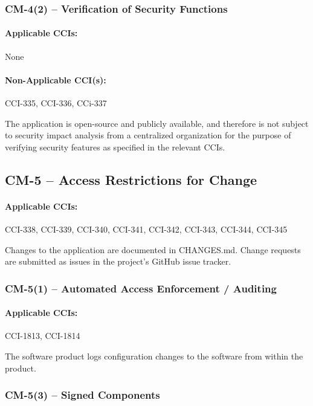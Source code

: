 \documentclass[letterpaper, 10pt, twoside]{article}
\begin{document}
\subsubsection {CM-4(2) -- Verification of Security Functions}

\paragraph{Applicable CCIs:} None

\paragraph{Non-Applicable CCI(s):} CCI-335, CCI-336, CCi-337

The application is open-source and publicly available, and therefore is not subject to security impact analysis from a centralized organization for the purpose of verifying security features as specified in the relevant CCIs.

\subsection{CM-5 -- Access Restrictions for Change}

\paragraph{Applicable CCIs:} CCI-338, CCI-339, CCI-340, CCI-341, CCI-342, CCI-343, CCI-344, CCI-345

Changes to the application are documented in CHANGES.md. Change requests are submitted as issues in the project's GitHub issue tracker.

\subsubsection{CM-5(1) -- Automated Access Enforcement / Auditing}

\paragraph{Applicable CCIs:} CCI-1813, CCI-1814

The software product logs configuration changes to the software from within the product.

\subsubsection{CM-5(3) -- Signed Components}
\end{document}
